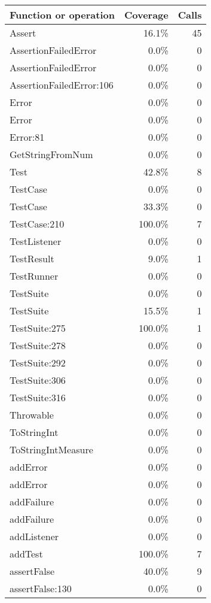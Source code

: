 \documentclass[a4paper]{article}
\begin{document}
\bigskip
\begin{longtable}{|l|r|r|}
\hline
Function or operation & Coverage & Calls \\
\hline
\hline
Assert & 16.1\% & 45 \\
\hline
AssertionFailedError & 0.0\% & 0 \\
\hline
AssertionFailedError & 0.0\% & 0 \\
\hline
AssertionFailedError:106 & 0.0\% & 0 \\
\hline
Error & 0.0\% & 0 \\
\hline
Error & 0.0\% & 0 \\
\hline
Error:81 & 0.0\% & 0 \\
\hline
GetStringFromNum & 0.0\% & 0 \\
\hline
Test & 42.8\% & 8 \\
\hline
TestCase & 0.0\% & 0 \\
\hline
TestCase & 33.3\% & 0 \\
\hline
TestCase:210 & 100.0\% & 7 \\
\hline
TestListener & 0.0\% & 0 \\
\hline
TestResult & 9.0\% & 1 \\
\hline
TestRunner & 0.0\% & 0 \\
\hline
TestSuite & 0.0\% & 0 \\
\hline
TestSuite & 15.5\% & 1 \\
\hline
TestSuite:275 & 100.0\% & 1 \\
\hline
TestSuite:278 & 0.0\% & 0 \\
\hline
TestSuite:292 & 0.0\% & 0 \\
\hline
TestSuite:306 & 0.0\% & 0 \\
\hline
TestSuite:316 & 0.0\% & 0 \\
\hline
Throwable & 0.0\% & 0 \\
\hline
ToStringInt & 0.0\% & 0 \\
\hline
ToStringIntMeasure & 0.0\% & 0 \\
\hline
addError & 0.0\% & 0 \\
\hline
addError & 0.0\% & 0 \\
\hline
addFailure & 0.0\% & 0 \\
\hline
addFailure & 0.0\% & 0 \\
\hline
addListener & 0.0\% & 0 \\
\hline
addTest & 100.0\% & 7 \\
\hline
assertFalse & 40.0\% & 9 \\
\hline
assertFalse:130 & 0.0\% & 0 \\

\end{longtable}
\end{document}
